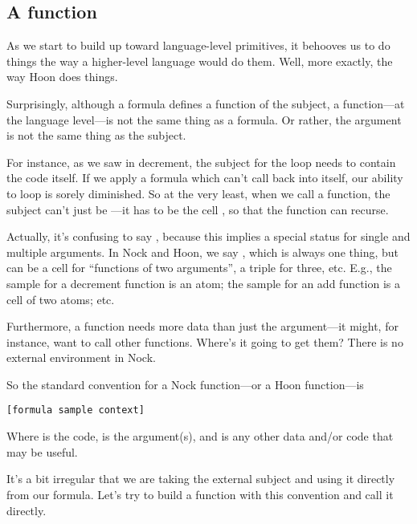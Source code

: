 \subsection{A function}

As we start to build up toward language-level primitives, it
behooves us to do things the way a higher-level language would do
them.  Well, more exactly, the way Hoon does things.

Surprisingly, although a formula defines a function of the
subject, a function---at the language level---is not the same
thing as a formula.  Or rather, the argument is not the same
thing as the subject.

For instance, as we saw in decrement, the subject for the loop
needs to contain the code itself.  If we apply a formula which
can't call back into itself, our ability to loop is sorely
diminished.  So at the very least, when we call a function,
the subject can't just be ---it has to be the cell
, so that the function can recurse.

Actually, it's confusing to say , because this implies
a special status for single and multiple arguments.  In Nock and
Hoon, we say , which is always one thing, but can be a
cell for ``functions of two arguments'', a triple for three, etc.
E.g., the sample for a decrement function is an atom; the sample
for an add function is a cell of two atoms; etc.

Furthermore, a function needs more data than just the argument---it might, for instance, want to call other functions.  Where's it
going to get them?  There is no external environment in Nock.

So the standard convention for a Nock function---or a Hoon
function---is

\begin{framed_shaded}
\begin{Verbatim}[fontsize=\relsize{-2.5},fontseries=b,commandchars=\\\{\}]
[formula sample context]
\end{Verbatim}
\end{framed_shaded}
Where  is the code,  is the argument(s), and
 is any other data and/or code that may be useful.

It's a bit irregular that we are taking the external subject
and using it directly from our formula.  Let's try to build a
function with this convention and call it directly.

